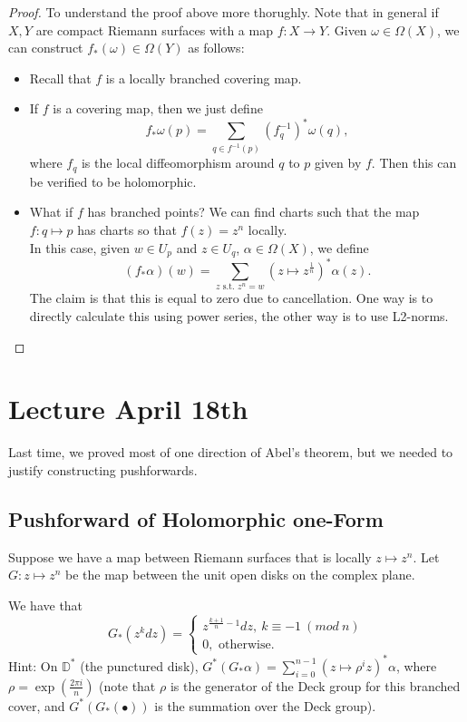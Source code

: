 \documentclass{article}
\begin{document}
{\begin{proof}
    To understand the proof above more thorughly. Note that in general if $X, Y$ are compact Riemann surfaces with a map $f: X \to Y$. Given $\omega \in \Omega(X)$, we can construct $f_*(\omega) \in \Omega(Y)$ as follows:
    \begin{itemize}
        \item Recall that $f$ is a locally branched covering map.
        \item If $f$ is a covering map, then we just define
        \[f_* \omega(p) = \sum_{q \in f^{-1}(p)} (f^{-1}_q)^* \omega(q),\]
        where $f_q$ is the local diffeomorphism around $q$ to $p$ given by $f$. Then this can be verified to be holomorphic.
        \item What if $f$ has branched points? We can find charts such that the map $f: q \mapsto p$ has charts so that $f(z) = z^n$ locally.\\

        In this case, given $w \in U_p$ and $z \in U_q$, $\alpha \in \Omega(X)$, we define
        \[(f_* \alpha)(w) = \sum_{z \text{ s.t. } z^n = w} (z \mapsto z^\frac{1}{n})^* \alpha(z).\]
        The claim is that this is equal to zero due to cancellation. One way is to directly calculate this using power series, the other way is to use L2-norms.
    \end{itemize}
\end{proof}

\newpage
\section{Lecture April 18th}

Last time, we proved most of one direction of Abel's theorem, but we needed to justify constructing pushforwards.

\subsection{Pushforward of Holomorphic one-Form}

Suppose we have a map between Riemann surfaces that is locally $z \mapsto z^n$. Let $G: z \mapsto z^n$ be the map between the unit open disks on the complex plane.

\begin{exercise}
    We have that
    \[G_*(z^k dz) = \begin{cases}
        z^{\frac{k+1}{n} - 1} dz,\ k \equiv -1\ (mod\ n)\\
        0, \text{ otherwise.}
    \end{cases}\]
    Hint: On $\mathbb{D}^*$ (the punctured disk),  $G^*(G_* \alpha) = \sum_{i = 0}^{n-1} (z \mapsto \rho^i z)^* \alpha$, where $\rho = \exp(\frac{2\pi i}{n})$ (note that $\rho$ is the generator of the Deck group for this branched cover, and $G^*(G_*( \bullet))$ is the summation over the Deck group).
\end{exercise}

}
\end{document}
